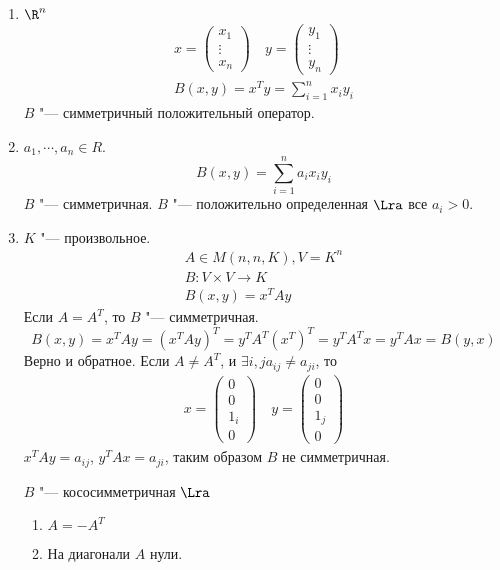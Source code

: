 \begin{exmp}\hfill
	\begin{enumerate}
	\item
		$\R^n$
		\begin{gather*}
			x = \begin{pmatrix}
				x_1 \\
				\vdots \\
				x_n
			\end{pmatrix} \quad
			y = \begin{pmatrix}
				y_1 \\
				\vdots \\
				y_n
			\end{pmatrix} \\
			B(x, y) = x^Ty = \sum_{i=1}^n x_iy_i
		\end{gather*}
		$B$ "--- симметричный положительный оператор.

	\item
		$a_1, \cdots, a_n \in R$.
		\[ B(x, y) = \sum_{i=1}^n a_ix_iy_i \]
		$B$ "--- симметричная.
		$B$ "--- положительно определенная $\Lra$ все $a_i > 0$.

	\item
		$K$ "--- произвольное.
		\begin{gather*}
			A \in M(n, n, K), V = K^n \\
			B \colon V \times V \to K \\
			B(x, y) = x^TAy
		\end{gather*}
		Если $A = A^{T}$, то $B$ "--- симметричная.
		\[ B(x, y) = x^TAy = (x^TAy)^T = y^TA^T(x^T)^T = y^TA^Tx = y^TAx = B(y, x) \]
		Верно и обратное.
		Если $A \ne A^{T}$, и $\exists i, j a_{ij} \ne a_{ji}$, то
		\begin{gather*}
			x = \begin{pmatrix}
				0 \\
				0 \\
				1_i \\
				0
			\end{pmatrix} \quad
			y = \begin{pmatrix}
					0 \\
					0 \\
					1_j \\
					0
			\end{pmatrix}
		\end{gather*}
		$x^{T}Ay = a_{ij}$, $y^TAx = a_{ji}$, таким образом $B$ не симметричная.
		
		$B$ "--- кососимметричная $\Lra$
		\begin{enumerate}
			\item $A = -A^T$
			\item На диагонали $A$ нули.
		\end{enumerate}


\end{enumerate}
\end{exmp}

